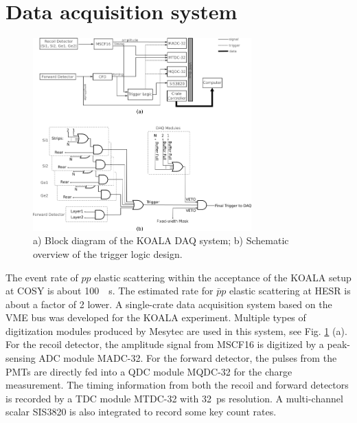 \documentclass[number,5p]{elsarticle}
\begin{document}
\section{Data acquisition system}
\label{sec:daq}
\begin{figure}[bt]
  \centering
  \includegraphics[width=0.75\textwidth]{./daq_scheme.png}
  \caption{a) Block diagram of the KOALA DAQ system; b) Schematic overview of
    the trigger logic design.}
  \label{fig:trigger_logic}
\end{figure}
The event rate of $pp$ elastic scattering within the acceptance of the KOALA
setup at COSY is about \SI[per-mode=power]{100}{\per\second}.
The estimated rate for $\bar{p}p$ elastic scattering at HESR is about a factor of 2
lower.
A single-crate data acquisition system based on the VME bus was developed for the KOALA experiment.
Multiple types of digitization modules produced by Mesytec \cite{mesytec} are
used in this system, see Fig. \ref{fig:trigger_logic} (a).
For the recoil detector, the amplitude signal from MSCF16 is digitized by a
peak-sensing ADC module MADC-32.
For the forward detector, the pulses from the PMTs are directly fed into a QDC
module MQDC-32 for the charge measurement.
The timing information from both the recoil and forward detectors is recorded by a TDC module MTDC-32 with \SI{32}{\pico\second} resolution.
A multi-channel scalar SIS3820 \cite{sis} is also integrated to record some key count rates.
\end{document}

